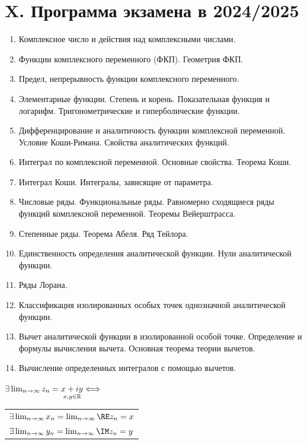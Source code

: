 \documentclass[12pt]{article}
\begin{document}

\clearpage

\section{X. Программа экзамена в 2024/2025}

\begin{enumerate}
    \item Комплексное число и действия над комплексными числами.
    \item Функции комплексного переменного (ФКП). Геометрия ФКП.
    \item Предел, непрерывность функции комплексного переменного.
    \item Элементарные функции. Степень и корень. Показательная функция и логарифм. Тригонометрические и гиперболические функции.
    \item Дифференцирование и аналитичность функции комплексной переменной. Условие Коши-Римана. Свойства аналитических функций.
    \item Интеграл по комплексной переменной. Основные свойства. Теорема Коши.
    \item Интеграл Коши. Интегралы, зависящие от параметра.
    \item Числовые ряды. Функциональные ряды. Равномерно сходящиеся ряды функций комплексной переменной. Теоремы Вейерштрасса.
    \item Степенные ряды. Теорема Абеля. Ряд Тейлора.
    \item Единственность определения аналитической функции. Нули аналитической функции.
    \item Ряды Лорана.
    \item Классификация изолированных особых точек однозначной аналитической функции.
    \item Вычет аналитической функции в изолированной особой точке. Определение и формулы вычисления вычета. Основная теорема теории вычетов.
    \item Вычисление определенных интегралов с помощью вычетов.
\end{enumerate}



    \tableofcontents
    \clearpage

    \begin{MyTheorem}
    \Ths $\exists \lim_{n \to \infty} z_n = \underset{x, y \in \mathbb{R}}{x + i y} \Longleftrightarrow $
    \begin{tabular}{l} $\exists \lim_{n \to \infty} x_n = \lim_{n \to \infty} \RE z_n = x$ \\ $\exists \lim_{n \to \infty} y_n = \lim_{n \to \infty} \IM z_n = y$ \end{tabular}
\end{MyTheorem}
\end{document}
